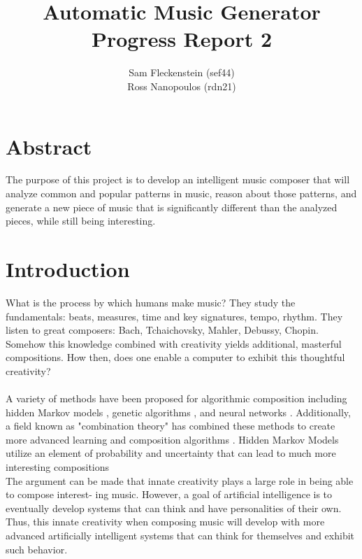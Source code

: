 \documentclass{article}
\begin{document}
\clearpage
{}
\begin{center}
\begin{minipage}{.6\textwidth}

\title{Automatic Music Generator \\ \vspace{2 pt} \Large{Progress Report 2}}
\author{Sam Fleckenstein (sef44) \\ Ross Nanopoulos (rdn21)}
\maketitle

\end{minipage}
\end{center}
\clearpage

\tableofcontents
\newpage

\section{Abstract}
The purpose of this project is to develop an intelligent music composer that will analyze common and 
popular patterns in music, reason about those patterns, and generate a new piece of music that is 
significantly different than the analyzed pieces, while still being interesting.

\newpage

\section{Introduction}
What is the process by which humans make music? They study the fundamentals: beats, measures, time
and key signatures, tempo, rhythm. They listen to great composers: Bach, Tchaichovsky, Mahler, Debussy,
Chopin. Somehow this knowledge combined with creativity yields additional, masterful compositions. How
then, does one enable a computer to exhibit this thoughtful creativity?\\
\\
A variety of methods have been proposed for algorithmic composition including hidden Markov models 
\cite{5492670}, genetic algorithms \cite{514161}, and neural networks \cite{4667040}. Additionally, 
a field known as "combination theory" has combined these methods to create more advanced learning and 
composition algorithms \cite{4626654}. Hidden Markov Models utilize an element of probability and 
uncertainty that can lead to much more interesting compositions
\\
The argument can be made that innate creativity plays a large role in being able to compose interest-
ing music. However, a goal of artificial intelligence is to eventually develop systems that can think and
have personalities of their own. Thus, this innate creativity when composing music will develop with more
advanced artificially intelligent systems that can think for themselves and exhibit such behavior.
\end{document}
